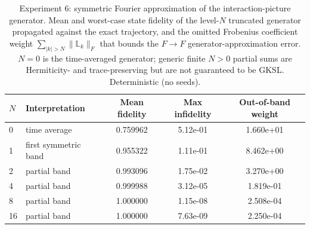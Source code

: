 \begin{table}[ht]
\centering
\caption{Experiment 6: symmetric Fourier approximation of the interaction-picture generator. Mean and worst-case state fidelity of the level-$N$ truncated generator propagated against the exact trajectory, and the omitted Frobenius coefficient weight $\sum_{|k|>N}\lVert \mathbb L_k\rVert_F$ that bounds the $F\!\to\!F$ generator-approximation error. $N{=}0$ is the time-averaged generator; generic finite $N>0$ partial sums are Hermiticity- and trace-preserving but are not guaranteed to be GKSL. Deterministic (no seeds).}
\label{tab:exp6}
\begin{tabular}{llccc}
\toprule
$N$ & Interpretation & Mean fidelity & Max infidelity & Out-of-band weight \\
\midrule
0 & time average & 0.759962 & 5.12e-01 & 1.660e+01 \\
1 & first symmetric band & 0.955322 & 1.11e-01 & 8.462e+00 \\
2 & partial band & 0.993096 & 1.75e-02 & 3.270e+00 \\
4 & partial band & 0.999988 & 3.12e-05 & 1.819e-01 \\
8 & partial band & 1.000000 & 1.15e-08 & 2.508e-04 \\
16 & partial band & 1.000000 & 7.63e-09 & 2.250e-04 \\
\bottomrule
\end{tabular}
\end{table}
